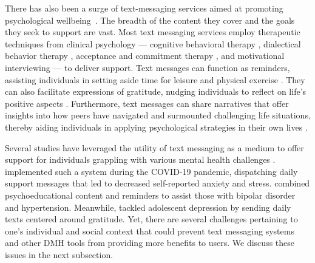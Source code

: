There has also been a surge of text-messaging services aimed at promoting psychological wellbeing~\cite{kretzschmar2019can, chikersal2020understanding, rathbone2017use, inkster2018empathy, morris2018towards, stowell2018designing, kornfield2022meeting, agyapong2020changes}. The breadth of the content they cover and the goals they seek to support are vast. Most text messaging services employ therapeutic techniques from clinical psychology — cognitive behavioral therapy \cite{willson2019cognitive}, dialectical behavior therapy \cite{linehan2014dbt}, acceptance and commitment therapy \cite{hayes2004acceptance}, and motivational interviewing \cite{hettema2005motivational} — to deliver support. Text messages can function as reminders, assisting individuals in setting aside time for leisure and physical exercise \cite{bhattacharjee2023investigating, figueroa2022daily}. They can also facilitate expressions of gratitude, nudging individuals to reflect on life's positive aspects \cite{bhattacharjee2022design}. Furthermore, text messages can share narratives that offer insights into how peers have navigated and surmounted challenging life situations, thereby aiding individuals in applying psychological strategies in their own lives \cite{bhattacharjee2022kind}. %

Several studies have leveraged the utility of text messaging as a medium to offer support for individuals grappling with various mental health challenges \cite{agyapong2020changes, levin2019outcomes, arps2018promoting, nobles2018identification, bhattacharjee2023investigating, agyapong2022text4hope}. \citet{agyapong2022text4hope} implemented such a system during the COVID-19 pandemic, dispatching daily support messages that led to decreased self-reported anxiety and stress. \citet{levin2019outcomes} combined psychoeducational content and reminders to assist those with bipolar disorder and hypertension. Meanwhile, \citet{arps2018promoting} tackled adolescent depression by sending daily texts centered around gratitude. Yet, there are several challenges pertaining to one's individual and social context that could prevent text messaging systems and other DMH tools from providing more benefits to users. We discuss these issues in the next subsection.


